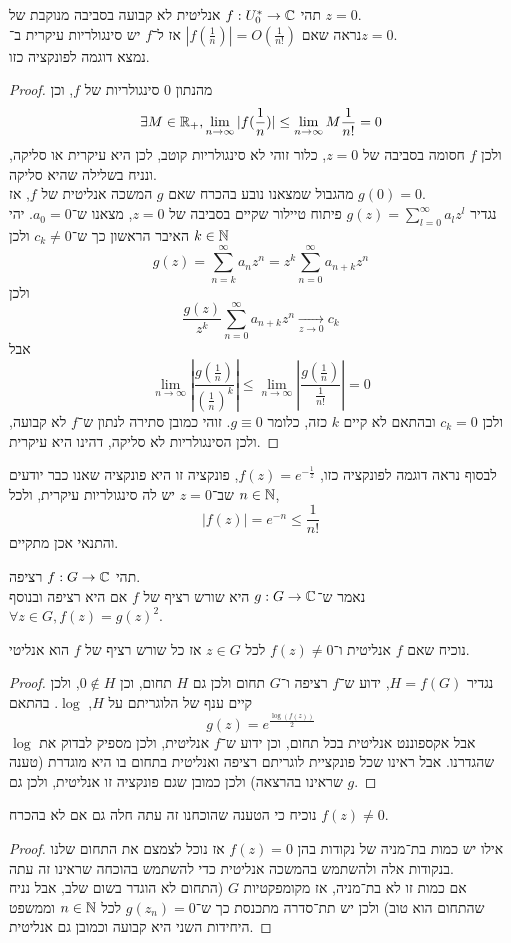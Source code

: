 \question{}
תהי $f : U_0^* \to \mathbb{C}$ אנליטית לא קבועה בסביבה מנוקבת של $z = 0$. \\
נראה שאם $|f(\frac{1}{n})| = O(\frac{1}{n!})$ אז ל־$f$ יש סינגולריות עיקרית ב־$z = 0$. \\
נמצא דוגמה לפונקציה כזו.
\begin{proof}
	מהנתון $0$ סינגולריות של $f$, וכן
	\[
		\exists M \in \mathbb{R}_+, \lim_{n \to \infty} |f(\frac{1}{n})|
		\le \lim_{n \to \infty} M \frac{1}{n!}
		= 0
	\]
	ולכן $f$ חסומה בסביבה של $z = 0$, כלור זוהי לא סינגולריות קוטב, לכן היא עיקרית או סליקה, ונניח בשלילה שהיא סליקה. \\
	מהגבול שמצאנו נובע בהכרח שאם $g$ המשכה אנליטית של $f$, אז $g(0) = 0$. \\
	נגדיר $g(z) = \sum_{l = 0}^{\infty} a_l z^l$ פיתוח טיילור שקיים בסביבה של $z = 0$, מצאנו ש־$a_0 = 0$.
	יהי $k \in \mathbb{N}$ האיבר הראשון כך ש־$c_k \ne 0$ ולכן
	\[
		g(z)
		= \sum_{n = k}^{\infty} a_n z^n
		= z^k \sum_{n = 0}^{\infty} a_{n + k} z^n
	\]
	ולכן
	\[
		\frac{g(z)}{z^k} \sum_{n = 0}^{\infty} a_{n + k} z^n \xrightarrow[z \to 0]{} c_k
	\]
	אבל
	\[
		\lim_{n \to \infty} \left\lvert \frac{g(\frac{1}{n})}{{(\frac{1}{n})}^k} \right\rvert
		\le \lim_{n \to \infty} \left\lvert \frac{g(\frac{1}{n})}{\frac{1}{n!}} \right\rvert
		= 0
	\]
	ולכן $c_k = 0$ ובהתאם לא קיים $k$ כזה, כלומר $g \equiv 0$.
	זוהי כמובן סתירה לנתון ש־$f$ לא קבועה, ולכן הסינגולריות לא סליקה, דהינו היא עיקרית.
\end{proof}
לבסוף נראה דוגמה לפונקציה כזו, $f(z) = e^{-\frac{1}{z}}$, פונקציה זו היא פונקציה שאנו כבר יודעים שב־$z = 0$ יש לה סינגולריות עיקרית, ולכל $n \in \mathbb{N}$,
\[
	|f(z)|
	= e^{-n}
	\le \frac{1}{n!}
\]
והתנאי אכן מתקיים.

\question{}
תהי $f : G \to \mathbb{C}$ רציפה. \\
נאמר ש־$g : G \to \mathbb{C}$ היא שורש רציף של $f$ אם היא רציפה ובנוסף $\forall z \in G, f(z) = {g(z)}^2$.

\subquestion{}
נוכיח שאם $f$ אנליטית ו־$f(z) \ne 0$ לכל $z \in G$ אז כל שורש רציף של $f$ הוא אנליטי.
\begin{proof}
	נגדיר $H = f(G)$, ידוע ש־$f$ רציפה ו־$G$ תחום ולכן גם $H$ תחום, וכן $0 \notin H$, ולכן קיים ענף של הלוגריתם על $H$, $\log$.
	בהתאם
	\[
		g(z) = e^{\frac{\log(f(z))}{2}}
	\]
	אבל אקספוננט אנליטית בכל תחום, וכן ידוע ש־$f$ אנליטית, ולכן מספיק לבדוק את $\log$ שהגדרנו.
	אבל ראינו שכל פונקציית לוגריתם רציפה ואנליטית בתחום בו היא מוגדרת (טענה שראינו בהרצאה) ולכן כמובן שגם פונקציה זו אנליטית, ולכן גם $g$.
\end{proof}

\subquestion{}
נוכיח כי הטענה שהוכחנו זה עתה חלה גם אם לא בהכרח $f(z) \ne 0$.
\begin{proof}
	אילו יש כמות בת־מניה של נקודות בהן $f(z) = 0$ אז נוכל לצמצם את התחום שלנו בנקודות אלה ולהשתמש בהמשכה אנליטית כדי להשתמש בהוכחה שראינו זה עתה. \\
	אם כמות זו לא בת־מניה, אז מקומפקטיות $G$ (התחום לא הוגדר בשום שלב, אבל נניח שהתחום הוא טוב) ולכן יש תת־סדרה מתכנסת כך ש־$g(z_n) = 0$ לכל $n \in \mathbb{N}$ וממשפט היחידות השני היא קבועה וכמובן גם אנליטית.
\end{proof}

